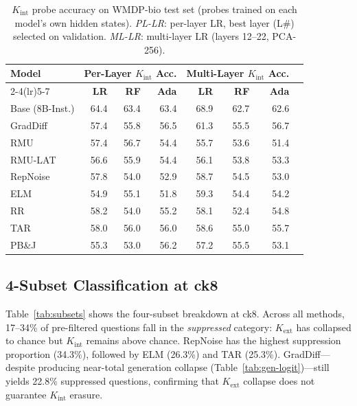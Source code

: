 \documentclass[11pt]{article}
\begin{document}
\begin{table}[t]
\centering
\caption{$K_\text{int}$ probe accuracy on WMDP-bio test set (probes trained on
each model's own hidden states). \emph{PL-LR}: per-layer LR, best layer (L\#)
selected on validation. \emph{ML-LR}: multi-layer LR (layers 12--22, PCA-256).}
\label{tab:probes-bio}
\small
\setlength{\tabcolsep}{6pt}
\begin{tabular}{lrrrrrrr}
\toprule
\multirow{2}{*}{\textbf{Model}} & \multicolumn{3}{c}{\textbf{Per-Layer $K_\text{int}$ Acc.}} &
\multicolumn{3}{c}{\textbf{Multi-Layer $K_\text{int}$ Acc.}} \\
\cmidrule(lr){2-4}\cmidrule(lr){5-7}
 & \textbf{LR} & \textbf{RF} & \textbf{Ada} & \textbf{LR} & \textbf{RF} & \textbf{Ada} \\
\midrule
Base (8B-Inst.)  & 64.4 & 63.4 & 63.4 & 68.9 & 62.7 & 62.6 \\
\midrule
GradDiff  & 57.4 & 55.8 & 56.5 & 61.3 & 55.5 & 56.7 \\
RMU       & 57.4 & 56.7 & 54.4 & 55.7 & 53.6 & 51.4 \\
RMU-LAT   & 56.6 & 55.9 & 54.4 & 56.1 & 53.8 & 53.3 \\
RepNoise  & 57.8 & 54.0 & 52.9 & 58.7 & 54.5 & 53.0 \\
ELM       & 54.9 & 55.1 & 51.8 & 59.3 & 54.4 & 54.2 \\
RR        & 58.2 & 54.0 & 55.2 & 58.1 & 52.4 & 54.8 \\
TAR       & 58.0 & 56.0 & 56.0 & 58.6 & 55.0 & 55.7 \\
PB\&J     & 55.3 & 53.0 & 56.2 & 57.2 & 55.5 & 53.1 \\
\bottomrule
\end{tabular}
\end{table}

\subsection{4-Subset Classification at ck8}
\label{sec:subset-counts}

Table~\ref{tab:subsets} shows the four-subset breakdown at ck8.
Across all methods, 17--34\% of pre-filtered questions fall in the
\emph{suppressed} category: $K_\text{ext}$ has collapsed to chance but
$K_\text{int}$ remains above chance.
RepNoise has the highest suppression proportion (34.3\%), followed by ELM
(26.3\%) and TAR (25.3\%).
GradDiff---despite producing near-total generation collapse
(Table~\ref{tab:gen-logit})---still yields 22.8\% suppressed questions,
confirming that $K_\text{ext}$ collapse does not guarantee $K_\text{int}$ erasure.
\end{document}
